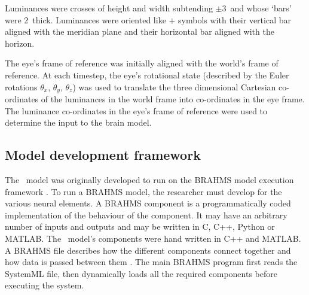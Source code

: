 \documentclass{frontiersSCNS}
\begin{document}
Luminances were crosses of height and width subtending $\pm$3\dg~and whose
`bars' were 2\dg~thick. Luminances were oriented like $+$ symbols with
their vertical bar aligned with the meridian plane and their horizontal bar
aligned with the horizon.

The eye's frame of reference was initially aligned with the world's frame
of reference.
At each timestep, the eye's rotational state (described by the Euler
rotations $\theta_x$, $\theta_y$, $\theta_z$) was
used to translate the three dimensional
Cartesian co-ordinates of the luminances in the world frame into co-ordinates
in the eye frame. The luminance co-ordinates in the eye's frame of reference
were used to determine the input to the brain model.

\subsection{Model development framework}

The \ccg~model was originally developed to run on the BRAHMS model
execution framework
\citep{mitchinson_brahms:_2010,mitchinson_brahms_2015}. To run a
BRAHMS model, the researcher must develop  for
the various neural elements. A BRAHMS component is a programmatically
coded implementation of the behaviour of the component. It may have an
arbitrary number of inputs and outputs and may be written in C, C++,
Python or MATLAB. The \ccg~model's components were hand written in C++
and MATLAB. A BRAHMS  file describes how the different
components connect together and how data is passed between them
\citep{mitchinson_brahms:_2010}. The main BRAHMS program first
reads the SystemML file, then dynamically loads all the required
components before executing the system.
\end{document}
